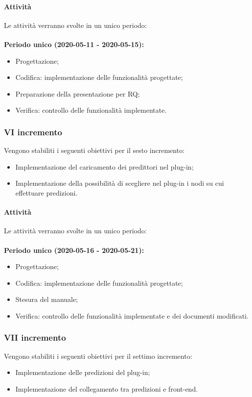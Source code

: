 \documentclass[../piano-di-progetto.tex]{subfiles}
\begin{document}
\paragraph{Attività}
Le attività verranno svolte in un unico periodo:
\\
\\
\textbf{Periodo unico (2020-05-11 - 2020-05-15):}
\begin{itemize}
    \item Progettazione;
    \item Codifica: implementazione delle funzionalità progettate;
    \item Preparazione della presentazione per RQ;
    \item Verifica: controllo delle funzionalità implementate.
\end{itemize}

\subsubsection{VI incremento}

 Vengono stabiliti i seguenti obiettivi per il sesto incremento:
 \begin{itemize}
     \item Implementazione del caricamento dei predittori nel plug-in;
     \item Implementazione della possibilità di scegliere nel plug-in i nodi su cui effettuare predizioni.
 \end{itemize}

\paragraph{Attività}
Le attività verranno svolte in un unico periodo:
\\
\\
\textbf{Periodo unico (2020-05-16 - 2020-05-21):}
\begin{itemize}
    \item Progettazione;
    \item Codifica: implementazione delle funzionalità progettate;
    \item Stesura del manuale;
    \item Verifica: controllo delle funzionalità implementate e dei documenti modificati.
\end{itemize}


\subsubsection{VII incremento}
 Vengono stabiliti i seguenti obiettivi per il settimo incremento:
 \begin{itemize}
    \item Implementazione delle predizioni del plug-in;
    \item Implementazione del collegamento tra predizioni e front-end.

\end{itemize}
\end{document}
